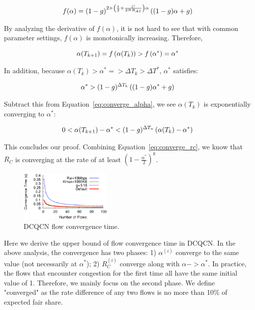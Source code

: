 \begin{equation}
\small
f(\alpha ) = {(1 - g)^{2 + \left( {\frac{t}{2} + \frac{C}{{2N{R_{AI}}}}} \right)\alpha }}\left( {(1 - g)\alpha  + g} \right)
\end{equation}

By analyzing the derivative of $f(\alpha )$, it is not hard to see that with common parameter 
settings, $f(\alpha )$ is monotonically increasing. Therefore, 

\begin{equation}
\small
\alpha ({T_{k + 1}}) = f\left( {\alpha ({T_k})} \right) > f\left( {{\alpha ^*}} \right) = {\alpha ^*}
\end{equation}

In addition, because $\alpha ({T_k}) > {\alpha ^*} => \Delta {T_k} > \Delta {T^*}$, 
$\alpha^{*}$ satisfies:

\begin{equation}
\small
{\alpha ^*} > {(1 - g)^{\Delta {T_k}}}\left( {(1 - g){\alpha ^*} + g} \right)
\end{equation}

Subtract this from Equation~\ref{eq:converge_alpha}, we see $\alpha ({T_k})$ is exponentially 
converging to $\alpha ^*$:

\begin{equation}
\small
0 < \alpha ({T_{k + 1}}) - {\alpha ^*} < {(1 - g)^{\Delta {T_n}}}\left( {\alpha ({T_k}) - {\alpha ^*}} \right)
\end{equation}

This concludes our proof. Combining Equation~\ref{eq:converge_rc}, we know that $R_C$ is 
converging at the rate of at least $( {1 - \frac{{{\alpha ^{*}}}}{2}} )^k$.

\begin{figure}[t]
\center
\includegraphics[width=0.4\textwidth]{figures/dcqcn_convergence_time.eps}
\caption{DCQCN flow convergence time.}
\label{fig:dcqcn_convergence_time}
\end{figure}

 Here we derive the upper bound of flow convergence time in DCQCN.
In the above analysis, the convergence has two phases: 1) $\alpha ^{(i)}$ converge to the 
same value (not necessarily at $\alpha^*$); 2) $R_C^{(i)}$ converge along with $\alpha -> \alpha^*$. 
In practice, the flows that encounter congestion for the first time all have the same initial
value of 1. Therefore, we mainly focus on the second phase. We define "converged" as the rate
difference of any two flows is no more than 10\% of expected fair share.

